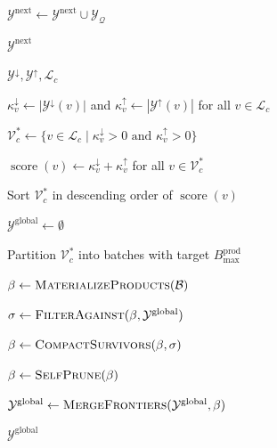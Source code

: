 \documentclass[letterpaper]{article}
\begin{document}
\begin{algorithm}[t!]
\begin{algorithmic}[1]
        \State
        $\mathcal{Y}^{\mathrm{next}}
        \gets
        \mathcal{Y}^{\mathrm{next}}\cup
        \mathcal{Y}_{\mathcal{Q}}$
    \EndFor

    \State \Return $\mathcal{Y}^{\mathrm{next}}$
\EndProcedure

{$\mathcal{Y}^{\downarrow},
 \mathcal{Y}^{\uparrow},
 \mathcal{L}_c$}

    \State
    $\kappa_v^{\downarrow}
    \gets
    |\mathcal{Y}^{\downarrow}(v)|$
    and
    $\kappa_v^{\uparrow}
    \gets
    |\mathcal{Y}^{\uparrow}(v)|$
    for all $v\in\mathcal{L}_c$

    \State
    $\mathcal{V}_c^*
    \gets
    \{
        v\in\mathcal{L}_c
        \mid
        \kappa_v^{\downarrow}>0
        \text{ and }
        \kappa_v^{\uparrow}>0
    \}$    

    \State
    $\operatorname{score}(v)
    \gets
    \kappa_v^{\downarrow}
    +
    \kappa_v^{\uparrow}$
    for all $v\in\mathcal{V}_c^*$

    \State
    Sort $\mathcal{V}_c^*$ in descending order of
    $\operatorname{score}(v)$

    \State
    $\mathcal{Y}^{\mathrm{global}}\gets\emptyset$
    
    \State
    Partition $\mathcal{V}_c^*$ into batches with target
    $B_{\max}^{\mathrm{prod}}$        

        \State
        $\beta
        \gets
        \Call{MaterializeProducts}
        {\mathcal{B}}$

            \State
            $\sigma
            \gets
            \Call{FilterAgainst}
            {\beta,\mathcal{Y}^{\mathrm{global}}}$

            \State
            $\beta
            \gets
            \Call{CompactSurvivors}
            {\beta,\sigma}$
        \EndIf

        \State
        $\beta
        \gets
        \Call{SelfPrune}{\beta}$

        \State
        $\mathcal{Y}^{\mathrm{global}}
        \gets
        \Call{MergeFrontiers}
        {\mathcal{Y}^{\mathrm{global}},\beta}$        
    \EndFor

    \State \Return $\mathcal{Y}^{\mathrm{global}}$
\EndProcedure

\State {}
\State \Return
{}
\end{algorithmic}
\end{algorithm}
\end{document}
